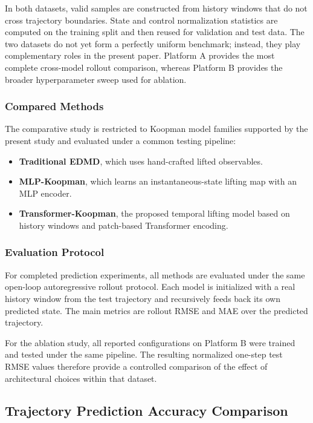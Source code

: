 \documentclass[journal]{IEEEtran}
\begin{document}
In both datasets, valid samples are constructed from history windows that do not cross trajectory boundaries. State and control normalization statistics are computed on the training split and then reused for validation and test data. The two datasets do not yet form a perfectly uniform benchmark; instead, they play complementary roles in the present paper. Platform A provides the most complete cross-model rollout comparison, whereas Platform B provides the broader hyperparameter sweep used for ablation.

\subsubsection{Compared Methods}

The comparative study is restricted to Koopman model families supported by the present study and evaluated under a common testing pipeline:
\begin{itemize}
    \item \textbf{Traditional EDMD}, which uses hand-crafted lifted observables.
    \item \textbf{MLP-Koopman}, which learns an instantaneous-state lifting map with an MLP encoder.
    \item \textbf{Transformer-Koopman}, the proposed temporal lifting model based on history windows and patch-based Transformer encoding.
\end{itemize}

\subsubsection{Evaluation Protocol}

For completed prediction experiments, all methods are evaluated under the same open-loop autoregressive rollout protocol. Each model is initialized with a real history window from the test trajectory and recursively feeds back its own predicted state. The main metrics are rollout RMSE and MAE over the predicted trajectory.

For the ablation study, all reported configurations on Platform B were trained and tested under the same pipeline. The resulting normalized one-step test RMSE values therefore provide a controlled comparison of the effect of architectural choices within that dataset.

\subsection{Trajectory Prediction Accuracy Comparison}
\end{document}
